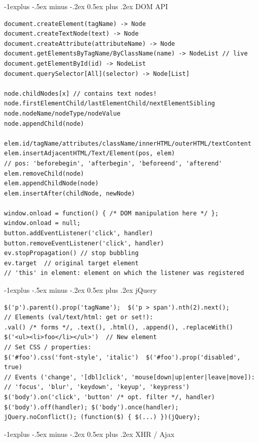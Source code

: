 \documentclass[10pt,landscape,a4paper]{article}
\makeatletter
\renewcommand{\subsection}{\@startsection{subsection}{2}{0mm}%
                                {-1explus -.5ex minus -.2ex}%
                                {0.5ex plus .2ex}%
                                {\normalfont\small\bfseries}}
\makeatother
\begin{document}
\begin{multicols*}{4}
\subsection{DOM API}

\begin{verbatim}
document.createElement(tagName) -> Node
document.createTextNode(text) -> Node
document.createAttribute(attributeName) -> Node
document.getElementsByTagName/ByClassName(name) -> NodeList // live
document.getElementById(id) -> NodeList
document.querySelector[All](selector) -> Node[List]

node.childNodes[x] // contains text nodes!
node.firstElementChild/lastElementChild/nextElementSibling
node.nodeName/nodeType/nodeValue
node.appendChild(node)

elem.id/tagName/attributes/className/innerHTML/outerHTML/textContent
elem.insertAdjacentHTML/Text/Element(pos, elem)
// pos: 'beforebegin', 'afterbegin', 'beforeend', 'afterend'
elem.removeChild(node)
elem.appendChildNode(node)
elem.insertAfter(childNode, newNode)

window.onload = function() { /* DOM manipulation here */ };
window.onload = null;
button.addEventListener('click', handler)
button.removeEventListener('click', handler)
ev.stopPropagation() // stop bubbling
ev.target  // original target element
// 'this' in element: element on which the listener was registered
\end{verbatim}

\columnbreak

\subsection{jQuery}

\begin{verbatim}
$('p').parent().prop('tagName');  $('p > span').nth(2).next();
// Elements (val/text/html: get or set!):
.val() /* forms */, .text(), .html(), .append(), .replaceWith()
$('<ul><li>foo</li></ul>')  // New element
// Set CSS / properties:
$('#foo').css('font-style', 'italic')  $('#foo').prop('disabled', true)
// Events ('change', '[dbl]click', 'mouse[down|up|enter|leave|move]):
// 'focus', 'blur', 'keydown', 'keyup', 'keypress')
$('body').on('click', 'button' /* opt. filter */, handler)
$('body').off(handler); $('body').once(handler);
jQuery.noConflict(); (function($) { $(...) })(jQuery);
\end{verbatim}

\subsection{XHR / Ajax}


\end{multicols*}
\end{document}
